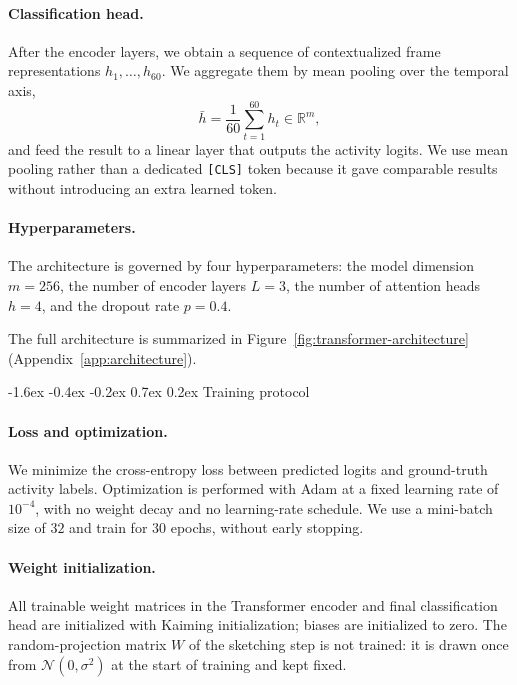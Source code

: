 \documentclass[10pt,twocolumn]{article}
\makeatletter
\renewcommand{\subsection}{%
  \@startsection{subsection}{2}{\z@}%
  {-1.6ex \@plus -0.4ex \@minus -0.2ex}%
  {0.7ex \@plus 0.2ex}%
  {\normalfont\normalsize\bfseries}}
\makeatother
\begin{document}
\paragraph{Classification head.}
After the encoder layers, we obtain a sequence of contextualized frame
representations $h_1, \ldots, h_{60}$. We aggregate them by mean pooling over
the temporal axis,
\[
\bar{h} = \frac{1}{60}\sum_{t=1}^{60} h_t \in \mathbb{R}^{m},
\]
and feed the result to a linear layer that outputs the activity logits. We use
mean pooling rather than a dedicated \texttt{[CLS]} token because it gave
comparable results without introducing an extra learned token.

\paragraph{Hyperparameters.}
The architecture is governed by four hyperparameters: the model dimension
$m = 256$, the number of encoder layers $L = 3$, the number of attention heads
$h = 4$, and the dropout rate $p = 0.4$.

The full architecture is summarized in
Figure~\ref{fig:transformer-architecture} (Appendix~\ref{app:architecture}).


\subsection{Training protocol}
\label{sec:training}

\paragraph{Loss and optimization.}
We minimize the cross-entropy loss between predicted logits and ground-truth
activity labels. Optimization is performed with Adam at a fixed learning rate
of $10^{-4}$, with no weight decay and no learning-rate schedule. We use a
mini-batch size of $32$ and train for $30$ epochs, without early stopping.

\paragraph{Weight initialization.}
All trainable weight matrices in the Transformer encoder and final
classification head are initialized with Kaiming initialization; biases are
initialized to zero. The random-projection matrix $W$ of the sketching step is
not trained: it is drawn once from $\mathcal{N}(0, \sigma^2)$ at the start of
training and kept fixed.
\end{document}
